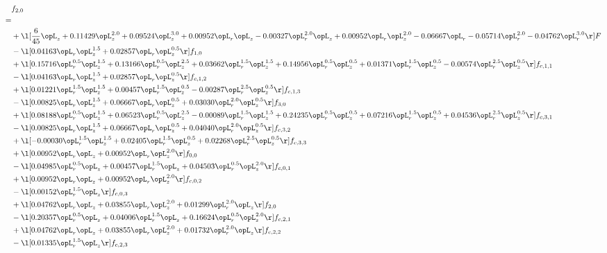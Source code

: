 \begin{alignat}{2} 
\label{eq:f_20_1} 
& f_{2,0} \nonumber \\ 
 = \\ 
& + \l[ \frac{6}{45} \opL_z +  0.11429 \opL_z^{2.0} +  0.09524 \opL_z^{3.0} +  0.00952 \opL_r \opL_z   -0.00327 \opL_r^{2.0} \opL_z +  0.00952 \opL_r \opL_z^{2.0}   -0.06667 \opL_r   -0.05714 \opL_r^{2.0}   -0.04762 \opL_r^{3.0}  \r] F \nonumber \\ 
& - \l[  0.04163 \opL_r \opL_z^{1.5} +  0.02857 \opL_r \opL_z^{0.5}  \r] f_{1,0} \nonumber \\ 
& + \l[  0.15716 \opL_r^{0.5} \opL_z^{1.5} +  0.13166 \opL_r^{0.5} \opL_z^{2.5} +  0.03662 \opL_r^{1.5} \opL_z^{1.5} +  0.14956 \opL_r^{0.5} \opL_z^{0.5} +  0.01371 \opL_r^{1.5} \opL_z^{0.5}   -0.00574 \opL_r^{2.5} \opL_z^{0.5}  \r] f_{c,1,1} \nonumber \\ 
& - \l[  0.04163 \opL_r \opL_z^{1.5} +  0.02857 \opL_r \opL_z^{0.5}  \r] f_{c,1,2} \nonumber \\ 
& + \l[  0.01221 \opL_r^{1.5} \opL_z^{1.5} +  0.00457 \opL_r^{1.5} \opL_z^{0.5}   -0.00287 \opL_r^{2.5} \opL_z^{0.5}  \r] f_{c,1,3} \nonumber \\ 
& - \l[  0.00825 \opL_r \opL_z^{1.5} +  0.06667 \opL_r \opL_z^{0.5} +  0.03030 \opL_r^{2.0} \opL_z^{0.5}  \r] f_{3,0} \nonumber \\ 
& + \l[  0.08188 \opL_r^{0.5} \opL_z^{1.5} +  0.06523 \opL_r^{0.5} \opL_z^{2.5}   -0.00089 \opL_r^{1.5} \opL_z^{1.5} +  0.24235 \opL_r^{0.5} \opL_z^{0.5} +  0.07216 \opL_r^{1.5} \opL_z^{0.5} +  0.04536 \opL_r^{2.5} \opL_z^{0.5}  \r] f_{c,3,1} \nonumber \\ 
& - \l[  0.00825 \opL_r \opL_z^{1.5} +  0.06667 \opL_r \opL_z^{0.5} +  0.04040 \opL_r^{2.0} \opL_z^{0.5}  \r] f_{c,3,2} \nonumber \\ 
& + \l[  -0.00030 \opL_r^{1.5} \opL_z^{1.5} +  0.02405 \opL_r^{1.5} \opL_z^{0.5} +  0.02268 \opL_r^{2.5} \opL_z^{0.5}  \r] f_{c,3,3} \nonumber \\ 
& + \l[  0.00952 \opL_r \opL_z +  0.00952 \opL_r \opL_z^{2.0}  \r] f_{0,0} \nonumber \\ 
& - \l[  0.04985 \opL_r^{0.5} \opL_z +  0.00457 \opL_r^{1.5} \opL_z +  0.04503 \opL_r^{0.5} \opL_z^{2.0}  \r] f_{c,0,1} \nonumber \\ 
& + \l[  0.00952 \opL_r \opL_z +  0.00952 \opL_r \opL_z^{2.0}  \r] f_{c,0,2} \nonumber \\ 
& - \l[  0.00152 \opL_r^{1.5} \opL_z  \r] f_{c,0,3} \nonumber \\ 
& + \l[  0.04762 \opL_r \opL_z +  0.03855 \opL_r \opL_z^{2.0} +  0.01299 \opL_r^{2.0} \opL_z  \r] f_{2,0} \nonumber \\ 
& - \l[  0.20357 \opL_r^{0.5} \opL_z +  0.04006 \opL_r^{1.5} \opL_z +  0.16624 \opL_r^{0.5} \opL_z^{2.0}  \r] f_{c,2,1} \nonumber \\ 
& + \l[  0.04762 \opL_r \opL_z +  0.03855 \opL_r \opL_z^{2.0} +  0.01732 \opL_r^{2.0} \opL_z  \r] f_{c,2,2} \nonumber \\ 
& - \l[  0.01335 \opL_r^{1.5} \opL_z  \r] f_{c,2,3} \nonumber \\ 
\end{alignat} 


